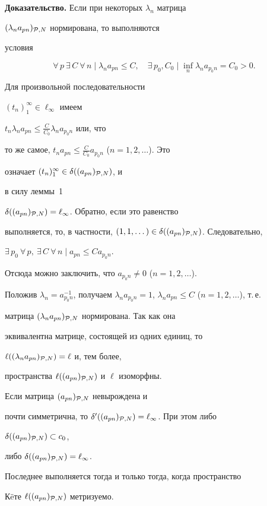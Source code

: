 {\bf Доказательство.} Если при некоторых $\lambda_n$ матрица


$(\lambda_n a_{pn})_{{\cal P},N}$ нормирована, то выполняются


условия


$$


\forall\,p\ \exists\, C\


\forall\, n\mid\lambda_na_{pn}\leq C,\quad


\exists\,p_0, C_0


\mid\inf\limits_n\lambda_na_{p_0n}=C_0>0.


$$


Для произвольной последовательности


$(t_n)_1^\infty\in\ell_\infty$ имеем


$t_n\lambda_na_{pn}\leq \frac{C}{C_0}\lambda_n a_{p_0n}$ или, что


то же самое, $t_na_{pn}\leq \frac{C}{C_0}a_{p_0n}$ ($n=1,2,\dotsc$). Это


означает $(t_n)_1^\infty\in\delta((a_{pn})_{{\cal P},N})$, и


в силу леммы~1\;


$\delta((a_{pn})_{{\cal P},N})=\ell_\infty$. Обратно, если это равенство


выполняется, то, в частности, $(1,1,\dots)\in


\delta((a_{pn})_{{\cal P},N})$. Следовательно,


$\exists\,p_0\ \forall\,p,\ \exists\, C\


\forall\, n\mid a_{pn}\leq Ca_{p_0n}$.


Отсюда можно заключить, что $a_{p_0n}\ne 0$ ($n=1,2,\dotsc$).


Положив $\lambda_n=a_{p_0n}^{-1}$, получаем $\lambda_n


a_{p_0n}=1$, $\lambda_na_{pn}\leq C$ ($n=1,2,\dotsc$), т.\,е.


матрица $(\lambda_na_{pn})_{{\cal P},N}$ нормирована. Так как она


эквивалентна матрице, состоящей из одних единиц, то


$\ell((\lambda_na_{pn})_{{\cal P},N})=\ell$ и, тем более,


пространства $\ell((a_{pn})_{{\cal P},N})$ и $\ell$ изоморфны.





\begin{lem}


Если матрица $(a_{pn})_{{\cal P},N}$ невырождена и


почти симметрична, то $\delta'((a_{pn})_{{\cal


P},N})=\ell_\infty$. При этом либо


$\delta((a_{pn})_{{\cal P},N})\subset c_0$,


либо $\delta((a_{pn})_{{\cal P},N})=\ell_\infty$.


Последнее выполняется тогда и только тогда, когда пространство


К\"eте $\ell((a_{pn})_{{\cal P},N})$ метризуемо.


\end{lem}





